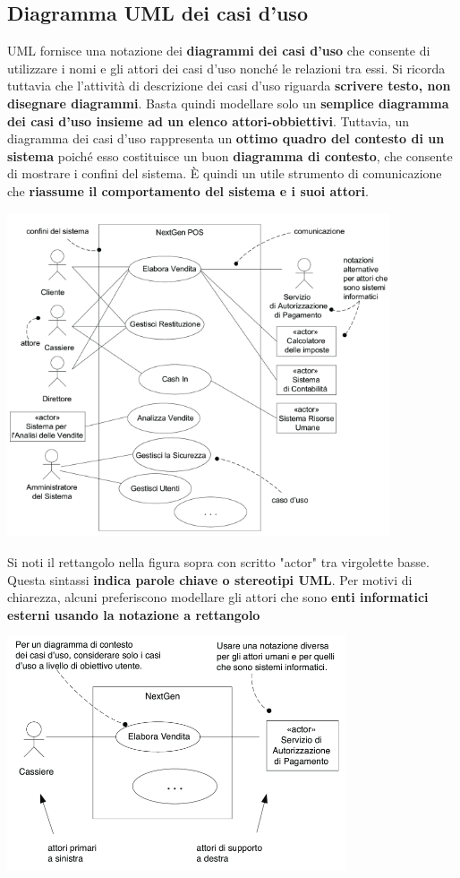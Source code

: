 \documentclass[12pt]{article}
\begin{document}
\subsection{Diagramma UML dei casi d'uso}
UML fornisce una notazione dei \textbf{diagrammi dei casi d'uso} che consente di utilizzare i nomi e gli attori dei casi d'uso nonché le relazioni tra essi.
Si ricorda tuttavia che l'attività di descrizione dei casi d'uso riguarda \textbf{scrivere testo, non disegnare diagrammi}.
Basta quindi modellare solo un \textbf{semplice diagramma dei casi d'uso insieme ad un elenco attori-obbiettivi}.
Tuttavia, un diagramma dei casi d'uso rappresenta un \textbf{ottimo quadro del contesto di un sistema} poiché esso costituisce un buon \textbf{diagramma di contesto}, che consente di mostrare i confini del sistema.
È quindi un utile strumento di comunicazione che \textbf{riassume il comportamento del sistema e i suoi attori}.
\begin{center}
    \includegraphics[width = 0.85\textwidth]{Images/39.png}
\end{center}
Si noti il rettangolo nella figura sopra con scritto "actor" tra virgolette basse.
Questa sintassi \textbf{indica parole chiave o stereotipi UML}. Per motivi di chiarezza, alcuni preferiscono modellare gli attori che sono \textbf{enti informatici esterni usando la notazione a rettangolo}
\begin{center}
    \includegraphics[width = 0.75\textwidth]{Images/40.png}
\end{center}
\end{document}
